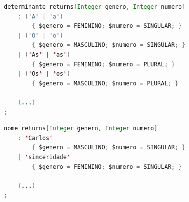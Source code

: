 \begin{center}
\begin{minipage}{13cm}
\begin{lstlisting}[language=java, basicstyle=\small, label={lst:det_dsl_excerpt}, caption=Excerpt of the ``determinante'' production]
determinante returns[Integer genero, Integer numero]
    : ('A' | 'a')
        { $genero = FEMININO; $numero = SINGULAR; }
    | ('O' | 'o')
        { $genero = MASCULINO; $numero = SINGULAR; }
    | ('As' | 'as')
        { $genero = FEMININO; $numero = PLURAL; }
    | ('Os' | 'os')
        { $genero = MASCULINO; $numero = PLURAL; }

    (...)
;
\end{lstlisting}
\end{minipage}
\end{center}

%


\begin{center}
\begin{minipage}{13cm}
\begin{lstlisting}[language=java, basicstyle=\small, label={lst:nome_dsl_excerpt}, caption=Excerpt of the ``nome'' production]
nome returns[Integer genero, Integer numero]
    : 'Carlos'
        { $genero = MASCULINO; $numero = SINGULAR; }
    | 'sinceridade'
        { $genero = FEMININO; $numero = SINGULAR; }

    (...)
;
\end{lstlisting}
\end{minipage}
\end{center}

